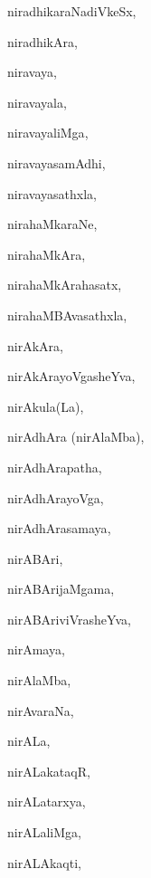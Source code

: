 \begin{multicols}{3}
{\noindent
{niradhikaraNadiVkeSx}, \pageref{niradhikaraNadiVkeSx}

\noindent
{niradhikAra}, \pageref{niradhikAra}

\noindent
{niravaya}, \pageref{niravaya}

\noindent
{niravayala}, \pageref{niravayala}

\noindent
{niravayaliMga}, \pageref{niravayaliMga}

\noindent
{niravayasamAdhi}, \pageref{niravayasamAdhi}

\noindent
{niravayasathxla}, \pageref{niravayasathxla}

\noindent
{nirahaMkaraNe}, \pageref{nirahaMkaraNe}

\noindent
{nirahaMkAra}, \pageref{nirahaMkAra}

\noindent
{nirahaMkArahasatx}, \pageref{nirahaMkArahasatx}

\noindent
{nirahaMBAvasathxla}, \pageref{nirahaMBAvasathxla}

\noindent
{nirAkAra}, \pageref{nirAkAra}

\noindent
{nirAkArayoVgasheYva}, \pageref{nirAkArayoVgasheYva}

\noindent
{nirAkula(La)}, \pageref{nirAkulaLa}

\noindent
{nirAdhAra (nirAlaMba)}, \pageref{nirAdhAra nirAlaMba}

\noindent
{nirAdhArapatha}, \pageref{nirAdhArapatha}

\noindent
{nirAdhArayoVga}, \pageref{nirAdhArayoVga}

\noindent
{nirAdhArasamaya}, \pageref{nirAdhArasamaya}

\noindent
{nirABAri}, \pageref{nirABAri}

\noindent
{nirABArijaMgama}, \pageref{nirABArijaMgama}

\noindent
{nirABAriviVrasheYva}, \pageref{nirABAriviVrasheYva}

\noindent
{nirAmaya}, \pageref{nirAmaya}

\noindent
{nirAlaMba}, \pageref{nirAlaMba}

\noindent
{nirAvaraNa}, \pageref{nirAvaraNa}

\noindent
{nirALa}, \pageref{nirALa}

\noindent
{nirALakataqR}, \pageref{nirALakataqR}

\noindent
{nirALatarxya}, \pageref{nirALatarxya}

\noindent
{nirALaliMga}, \pageref{nirALaliMga}

\noindent
{nirALAkaqti}, \pageref{nirALAkaqti}

}
\end{multicols}
